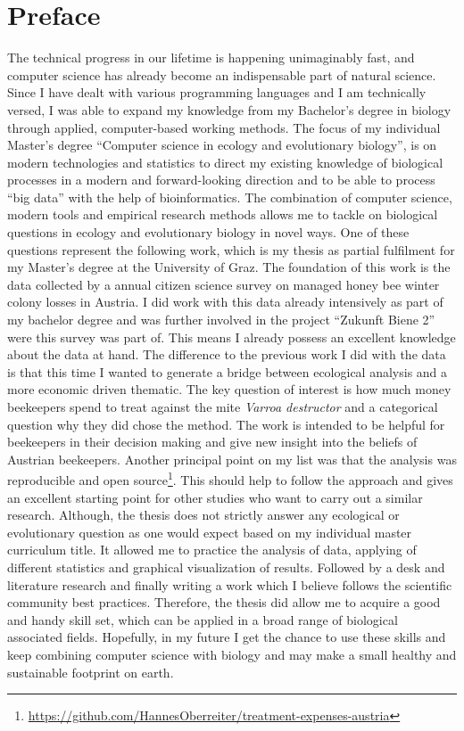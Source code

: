 \chapter*{Preface}
\label{sec:Preface}
\vspace*{-10mm}

The technical progress in our lifetime is happening unimaginably fast, and computer science has already become an indispensable part of natural science. Since I have dealt with various programming languages and I am technically versed, I was able to expand my knowledge from my Bachelor's degree in biology through applied, computer-based working methods. The focus of my individual Master's degree \enquote{Computer science in ecology and evolutionary biology}, is on modern technologies and statistics to direct my existing knowledge of biological processes in a modern and forward-looking direction and to be able to process \enquote{big data} with the help of bioinformatics. The combination of computer science, modern tools and empirical research methods allows me to tackle on biological questions in ecology and evolutionary biology in novel ways. One of these questions represent the following work, which is my thesis as partial fulfilment for my Master's degree at the University of Graz. The foundation of this work is the data collected by a annual citizen science survey on managed honey bee winter colony losses in Austria. I did work with this data already intensively as part of my bachelor degree and was further involved in the project \enquote{Zukunft Biene 2} were this survey was part of. This means I already possess an excellent knowledge about the data at hand. The difference to the previous work I did with the data is that this time I wanted to generate a bridge between ecological analysis and a more economic driven thematic. The key question of interest is how much money beekeepers spend to treat against the mite \textit{Varroa destructor} and a categorical question why they did chose the method. The work is intended to be helpful for beekeepers in their decision making and give new insight into the beliefs of Austrian beekeepers. Another principal point on my list was that the analysis was reproducible and open source\footnote{\url{https://github.com/HannesOberreiter/treatment-expenses-austria}}. This should help to follow the approach and gives an excellent starting point for other studies who want to carry out a similar research. Although, the thesis does not strictly answer any ecological or evolutionary question as one would expect based on my individual master curriculum title. It allowed me to practice the analysis of data, applying of different statistics and graphical visualization of results. Followed by a desk and literature research and finally writing a work which I believe follows the scientific community best practices. Therefore, the thesis did allow me to acquire a good and handy skill set, which can be applied in a broad range of biological associated fields. Hopefully, in my future I get the chance to use these skills and keep combining computer science with biology and may make a small healthy and sustainable footprint on earth.